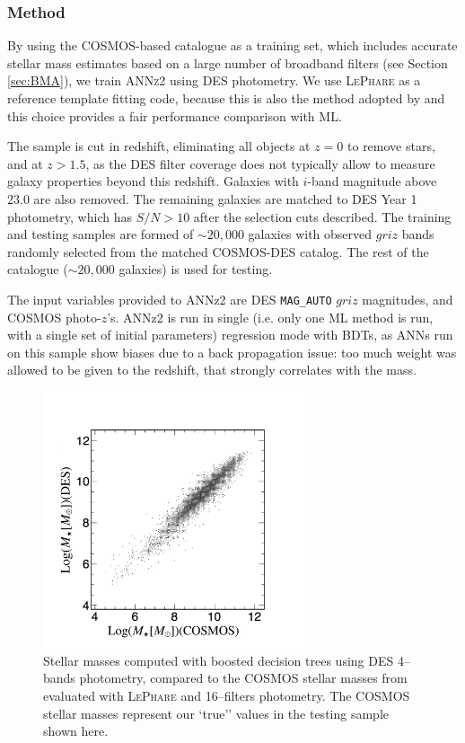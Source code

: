 \subsubsection{Method}
By using the \citet{laigle} COSMOS-based catalogue as a training set, which includes accurate stellar mass estimates based on a large number of broadband filters (see Section \ref{sec:BMA}), we train \textsc{ANNz2} using DES photometry. We use \textsc{LePhare} as a reference template fitting code, because this is also the method adopted by \citet{laigle} and this choice provides a fair performance comparison with ML.

The sample is cut in redshift, eliminating all objects at $z=0$ to remove stars, and at $z>1.5$, as the DES filter coverage does not typically allow to measure galaxy properties beyond this redshift. Galaxies with  $i$-band  magnitude above 23.0 are also removed. The remaining galaxies are matched to DES Year 1 photometry, which has $S/N>10$ after the selection cuts described. The training and testing samples are formed of $\sim 20,000$ galaxies with observed $griz$ bands randomly selected from the matched COSMOS-DES catalog. The rest of the catalogue ($\sim 20,000$ galaxies) is used for testing. 

The input variables provided to ANNz2 are DES \texttt{MAG\_AUTO} $griz$ magnitudes, and COSMOS photo-$z$'s. ANNz2 is run in single (i.e. only one ML method is run, with a single set of initial parameters) regression mode with BDTs, as ANNs run on this sample show biases due to a back propagation  issue: too much weight was allowed to be given to the redshift, that strongly correlates with the mass. %

\begin{figure}\centering \includegraphics[width=0.7\textwidth]{./chapters/chapter2/figs/corRegTrgZ_ANNZ_best_MGcnvs.jpg}\caption{Stellar masses computed with boosted decision trees using DES 4--bands photometry, compared to the COSMOS stellar masses from \citet{laigle} evaluated with \textsc{LePhare} and 16--filters photometry. The COSMOS stellar masses represent our `true'' values in the testing sample shown here.}\label{fig:m_vs_m_bdt}\end{figure}

